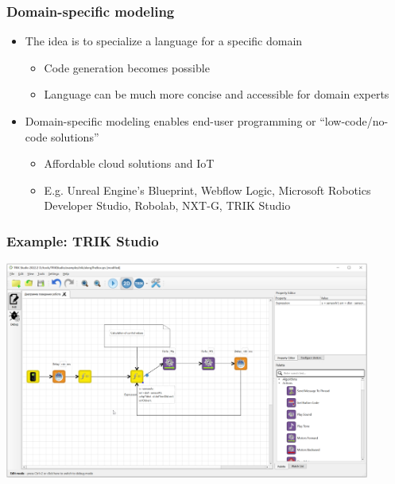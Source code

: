 \documentclass{slides-style}
\begin{document}
    \begin{frame}
        \frametitle{Domain-specific modeling}
        \begin{itemize}
            \item The idea is to specialize a language for a specific domain
            \begin{itemize}
                \item Code generation becomes possible
                \item Language can be much more concise and accessible for domain experts
            \end{itemize}
            \item Domain-specific modeling enables end-user programming or ``low-code/no-code solutions''
            \begin{itemize}
                \item Affordable cloud solutions and IoT
                \item E.g. Unreal Engine's Blueprint, Webflow Logic, Microsoft Robotics Developer Studio, Robolab, NXT-G, TRIK Studio
            \end{itemize}
        \end{itemize}
    \end{frame}

    \begin{frame}
        \frametitle{Example: TRIK Studio}
        \begin{center}
            \includegraphics[width=0.9\textwidth]{trik-studio.png}
        \end{center}
    \end{frame}
\end{document}
